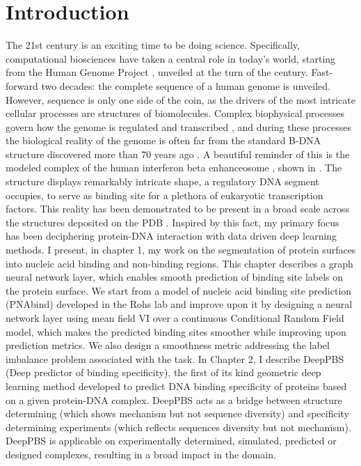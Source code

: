 \section*{Introduction}

The 21st century is an exciting time to be doing science. Specifically, computational biosciences have taken a central role in today's world, starting from the Human Genome Project \citep{international2001initial}, unveiled at the turn of the century. Fast-forward  two decades: the complete sequence of a human genome  \citep{nurk2022complete} is unveiled. However, sequence is only one side of the coin, as the drivers of the most intricate cellular processes are structures of biomolecules. Complex biophysical processes govern how the genome is regulated and transcribed \citep{lambert2018human}, and during these processes the biological reality of the genome is often far from the standard B-DNA structure discovered more than 70 years ago \citep{watson1953}. A beautiful reminder of this is the modeled complex of the human interferon beta enhanceosome \citep{panne2007atomic}, shown in . The structure displays remarkably intricate shape, a regulatory DNA segment occupies, to serve as binding site for a plethora of eukaryotic transcription factors. This reality has been demonstrated \citep{rohs2009role} to be present in a broad scale across the structures deposited on the PDB \citep{berman2000protein}. Inspired by this fact, my primary focus has been deciphering protein-DNA interaction with data driven deep learning methods. I present, in chapter 1,
my work on the segmentation of protein surfaces into nucleic acid binding and non-binding regions. This chapter describes a graph neural network layer, which enables smooth prediction of binding site labels on the protein surface. We start from a model of nucleic acid binding site
prediction (PNAbind) developed in the Rohs lab and improve upon it by designing a neural network layer using mean field
VI over a continuous Conditional Random Field model, which makes the predicted binding sites smoother while improving upon prediction metrics. We also design a smoothness metric addressing the label imbalance problem associated with the task.
In Chapter 2, I describe DeepPBS (Deep predictor of binding specificity), the first of its kind geometric deep learning method developed to predict DNA binding specificity of proteins based on a given protein-DNA complex. DeepPBS acts as a bridge between structure determining (which shows mechanism but not sequence diversity) and specificity determining experiments (which reflects sequences diversity but not mechanism). DeepPBS is applicable on experimentally determined, simulated, predicted or designed complexes, resulting in a broad impact in the domain.

